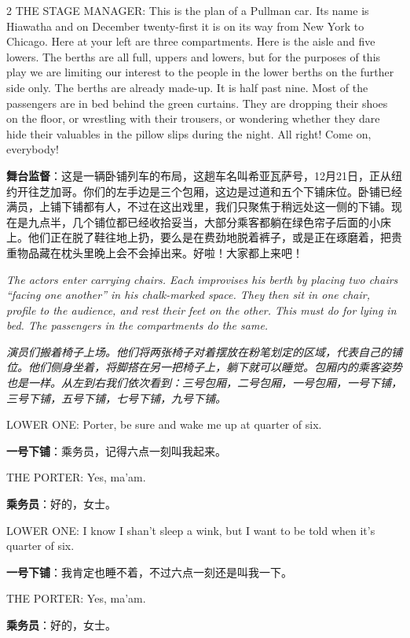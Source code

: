\documentclass[lang=cn,newtx,10pt,scheme=chinese]{elegantbook}
\newcommand{\pair}[2]{%
\switchcolumn* #2\par
\switchcolumn  #1\par
}
\begin{document}
\begin{paracol}{2}
\pair{
    \textbf{舞台监督}：这是一辆卧铺列车的布局，这趟车名叫希亚瓦萨号，12月21日，正从纽约开往芝加哥。你们的左手边是三个包厢，这边是过道和五个下铺床位。卧铺已经满员，上铺下铺都有人，不过在这出戏里，我们只聚焦于稍远处这一侧的下铺。现在是九点半，几个铺位都已经收拾妥当，大部分乘客都躺在绿色帘子后面的小床上。他们正在脱了鞋往地上扔，要么是在费劲地脱着裤子，或是正在琢磨着，把贵重物品藏在枕头里晚上会不会掉出来。好啦！大家都上来吧！
}{
    THE STAGE MANAGER: This is the plan of a Pullman car. Its name is Hiawatha and on December twenty-first it is on its way from New York to Chicago. Here at your left are three compartments. Here is the aisle and five lowers. The berths are all full, uppers and lowers, but for the purposes of this play we are limiting our interest to the people in the lower berths on the further side only. The berths are already made-up. It is half past nine. Most of the passengers are in bed behind the green curtains. They are dropping their shoes on the floor, or wrestling with their trousers, or wondering whether they dare hide their valuables in the pillow slips during the night. All right! Come on, everybody!
    \newline
    \newline
}

\pair{
    \textit{演员们搬着椅子上场。他们将两张椅子对着摆放在粉笔划定的区域，代表自己的铺位。他们侧身坐着，将脚搭在另一把椅子上，躺下就可以睡觉。包厢内的乘客姿势也是一样。从左到右我们依次看到：三号包厢，二号包厢，一号包厢，一号下铺，三号下铺，五号下铺，七号下铺，九号下铺。}
}{
    \textit{The actors enter carrying chairs. Each improvises his berth by placing two chairs “facing one another” in his chalk-marked space. They then sit in one chair, profile to the audience, and rest their feet on the other. This must do for lying in bed. The passengers in the compartments do the same.}
    \newline
    \newline
    \newline
}

\pair{
    \textbf{一号下铺}：乘务员，记得六点一刻叫我起来。
}{
    LOWER ONE: Porter, be sure and wake me up at quarter of six.
}

\pair{
    \textbf{乘务员}：好的，女士。
}{
    THE PORTER: Yes, ma'am.
}

\pair{
    \textbf{一号下铺}：我肯定也睡不着，不过六点一刻还是叫我一下。
}{
    LOWER ONE: I know I shan't sleep a wink, but I want to be told when it's quarter of six.
}

\pair{
    \textbf{乘务员}：好的，女士。
}{
    THE PORTER: Yes, ma'am.
}


\end{paracol}
\end{document}
